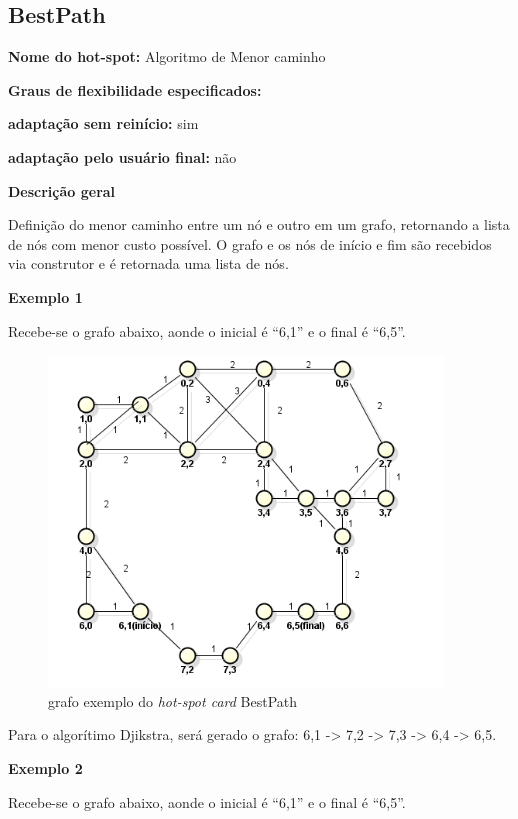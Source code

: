 \begin{apendicesenv}
\section{BestPath}

{\large \textbf{Nome do hot-spot:}} Algoritmo de Menor caminho

{\large \textbf{Graus de flexibilidade especificados:}}

\textbf{adaptação sem reinício:} sim

\textbf{adaptação pelo usuário final:} não

{\large \textbf{Descrição geral}}

Definição do menor caminho entre um nó e outro em um grafo, retornando a lista de nós com menor custo possível. O grafo e os nós de início e fim são recebidos via construtor e é retornada uma lista de nós.

{\large \textbf{Exemplo 1}}

Recebe-se o grafo abaixo, aonde o inicial é “6,1” e o final é “6,5”.

\begin{figure}[H]
	\centering
	\label{figXX}
		\includegraphics[keepaspectratio=true,scale=0.7]{figuras/grafohotspotcard1.PNG}
	\caption{grafo exemplo do \textit{hot-spot card} BestPath}
\end{figure}

Para o algorítimo Djikstra, será gerado o grafo: 6,1 -> 7,2 -> 7,3 -> 6,4 -> 6,5.

{\large \textbf{Exemplo 2}}

Recebe-se o grafo abaixo, aonde o inicial é “6,1” e o final é “6,5”.


\end{apendicesenv}
